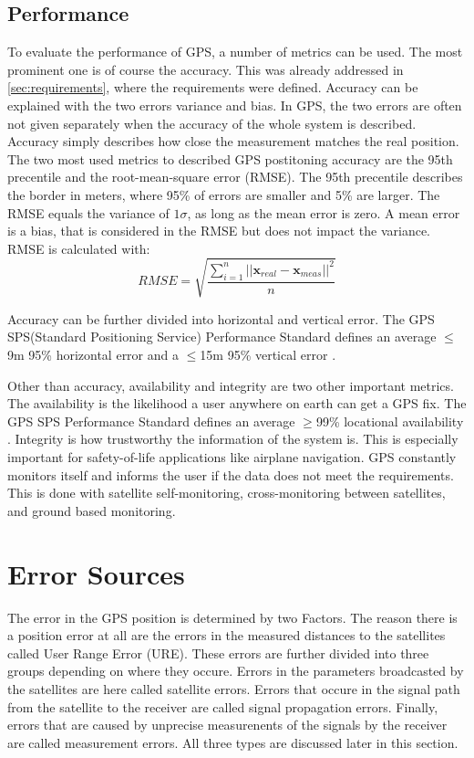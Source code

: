 \subsection{Performance}

To evaluate the performance of GPS, a number of metrics can be used.
The most prominent one is of course the accuracy.
This was already addressed in \ref{sec:requirements}, where the requirements were defined.
Accuracy can be explained with the two errors variance and bias.
In GPS, the two errors are often not given separately when the accuracy of the whole system is described.
Accuracy simply describes how close the measurement matches the real position.
The two most used metrics to described GPS postitoning accuracy are the 95th precentile and the root-mean-square error (RMSE).
The 95th precentile describes the border in meters, where 95\% of errors are smaller and 5\% are larger.
The RMSE equals the variance of $1\sigma$, as long as the mean error is zero.
A mean error is a bias, that is considered in the RMSE but does not impact the variance.
RMSE is calculated with:
\begin{equation}
 RMSE = \sqrt{\frac{\sum\limits_{i=1}^n \lvert\lvert \textbf{x}_{real} - \textbf{x}_{meas} \rvert\rvert^2}{n}}
\end{equation}

Accuracy can be further divided into horizontal and vertical error.
The GPS SPS(Standard Positioning Service) Performance Standard defines an average $\leq$9m 95\% horizontal error and a $\leq$15m 95\% vertical error \cite{SPS_Performance}.

Other than accuracy, availability and integrity are two other important metrics.
The availability is the likelihood a user anywhere on earth can get a GPS fix.
The GPS SPS Performance Standard defines an average $\geq$99\% locational availability \cite{SPS_Performance}.
Integrity is how trustworthy the information of the system is.
This is especially important for safety-of-life applications like airplane navigation.
GPS constantly monitors itself and informs the user if the data does not meet the requirements.
This is done with satellite self-monitoring, cross-monitoring between satellites, and ground based monitoring.


\section{Error Sources}\label{sec:error_sources}

The error in the GPS position is determined by two Factors.
The reason there is a position error at all are the errors in the measured distances to the satellites called User Range Error (URE).
These errors are further divided into three groups depending on where they occure.
Errors in the parameters broadcasted by the satellites are here called satellite errors.
Errors that occure in the signal path from the satellite to the receiver are called signal propagation errors.
Finally, errors that are caused by unprecise measurenents of the signals by the receiver are called measurement errors.
All three types are discussed later in this section.

